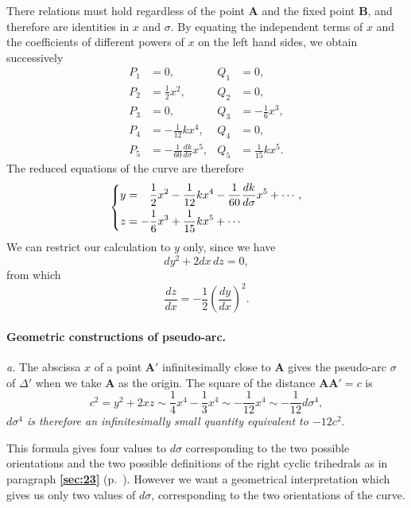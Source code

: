 \documentclass[leqno,11pt]{book}
\numberwithin{equation}{chapter}
\theoremstyle{shape1}
\theoremstyle{shapesmall}
\newcommand{\fsref}[1]{{\rm\textsection\textbf{\ref{sec:#1}}}}
\begin{document}
There relations must hold regardless of the point $\mathbf{A}$ and the fixed point $\mathbf{B}$, and therefore are identities in $x$ and $\sigma$. By equating the independent terms of $x$ and the coefficients of different powers of $x$ on the left hand sides, we obtain successively
\begin{align*}
  P_{1}&=0,&Q_{1}&=0,\\
  P_{2}&=\frac{1}{2}x^{2},&Q_{2}&=0,\\
  P_{3}&=0,&Q_{3}&=-\frac{1}{6}x^{3},\\
  P_{4}&=-\frac{1}{12}kx^{4},&Q_{4}&=0,\\
  P_{5}&=-\frac{1}{60}\frac{dk}{d\sigma}x^{5},&Q_{5}&=\frac{1}{15}kx^{5}.
\end{align*}
The reduced equations of the curve are therefore
\begin{equation}
  \label{eq:2.26}
  \left\{
    \begin{aligned}
      y&=\hphantom{+}\frac{1}{2}x^{2}-\frac{1}{12}kx^{4}-\frac{1}{60}\frac{dk}{d\sigma}x^{5}+\cdots,\\
      z&=-\frac{1}{6}x^{3}+\frac{1}{15}kx^{5}+\cdots
    \end{aligned}
  \right.
\end{equation}
We can restrict our calculation to $y$ only, since we have
\[
dy^{2}+2dx\,dz=0,
\]
from which
\[
\frac{dz}{dx}=-\frac{1}{2}\left(\frac{dy}{dx}\right)^{2}.
\]

\paragraph{Geometric constructions of pseudo-arc.}
\label{sec:40}
\emph{a.} The abscissa $x$ of a point $\mathbf{A}'$ infinitesimally close to $\mathbf{A}$ gives the pseudo-arc $\sigma$ of $\Delta'$ when we take $\mathbf{A}$ as the origin. The square of the distance $\mathbf{AA}'=c$ is
\begin{equation}
  \label{eq:2.27}
  c^{2}=y^{2}+2xz\sim \frac{1}{4}x^{4}-\frac{1}{3}x^{4}\sim-\frac{1}{12}x^{4}\sim-\frac{1}{12}d\sigma^{4},
\end{equation}
\emph{$d\sigma^{4}$ is therefore an infinitesimally small quantity equivalent to $-12c^{2}$}.

This formula gives four values to $d\sigma$ corresponding to the two possible orientations and the two possible definitions of the right cyclic trihedrals as in paragraph \fsref{23} (p.~\pageref{sec:23}). However we want a geometrical interpretation which gives us only two values of $d\sigma$, corresponding to the two orientations of the curve.
\end{document}
